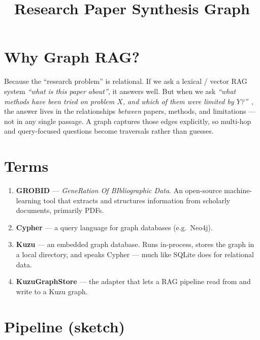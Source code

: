 \documentclass[11pt]{article}
\title{\vspace{-2em}\textbf{Research Paper Synthesis Graph}}
\date{}
\author{}
\begin{document}
\maketitle
\vspace{-3em}

\section{Why Graph RAG?}

Because the ``research problem'' is relational. If we ask a lexical /
vector RAG system \emph{``what is this paper about''}, it answers well.
But when we ask \emph{``what methods have been tried on problem $X$, and
which of them were limited by $Y$?''}~\cite{edge2024graphrag}, the answer
lives in the relationships \emph{between} papers, methods, and
limitations --- not in any single passage. A graph captures those edges
explicitly, so multi-hop and query-focused questions become traversals
rather than guesses.

\section{Terms}

\begin{enumerate}[label=\arabic*.]
  \item \textbf{GROBID} --- \emph{GeneRation Of BIbliographic Data}. An
        open-source machine-learning tool that extracts and structures
        information from scholarly documents, primarily PDFs.
  \item \textbf{Cypher} --- a query language for graph databases (e.g.\
        Neo4j).
  \item \textbf{Kuzu} --- an embedded graph database. Runs in-process,
        stores the graph in a local directory, and speaks Cypher --- much
        like SQLite does for relational data.
  \item \textbf{KuzuGraphStore} --- the adapter that lets a RAG pipeline
        read from and write to a Kuzu graph.
\end{enumerate}

\section{Pipeline (sketch)}
\end{document}
